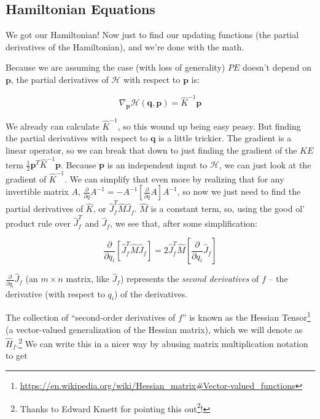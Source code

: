 \documentclass[]{article}
\renewcommand{\href}[2]{#2\footnote{\url{#1}}}
\begin{document}
\hypertarget{hamiltonian-equations}{%
\subsection{Hamiltonian Equations}\label{hamiltonian-equations}}

We got our Hamiltonian! Now just to find our updating functions (the partial
derivatives of the Hamiltonian), and we're done with the math.

Because we are assuming the case (with loss of generality) \(PE\) doesn't depend
on \(\mathbf{p}\), the partial derivatives of \(\mathcal{H}\) with respect to
\(\mathbf{p}\) is:

\[
\nabla_{\mathbf{p}} \mathcal{H}(\mathbf{q},\mathbf{p}) = \hat{K}^{-1} \mathbf{p}
\]

We already can calculate \(\hat{K}^{-1}\), so this wound up being easy peasy.
But finding the partial derivatives with respect to \(\mathbf{q}\) is a little
trickier. The gradient is a linear operator, so we can break that down to just
finding the gradient of the \(KE\) term
\(\frac{1}{2} \mathbf{p}^T \hat{K}^{-1} \mathbf{p}\). Because \(\mathbf{p}\) is
an independent input to \(\mathcal{H}\), we can just look at the gradient of
\(\hat{K}^{-1}\). We can simplify that even more by realizing that for any
invertible matrix \(A\),
\(\frac{\partial}{\partial q} A^{-1} = - A^{-1} \left[ \frac{\partial}{\partial q} A \right] A^{-1}\),
so now we just need to find the partial derivatives of \(\hat{K}\), or
\(\hat{J}_f^T \hat{M} \hat{J}_f\). \(\hat{M}\) is a constant term, so, using the
good ol' product rule over \(\hat{J}_f^T\) and \(\hat{J}_f\), we see that, after
some simplification:

\[
\frac{\partial}{\partial q_i} \left[ \hat{J}_f^T \hat{M} \hat{J}_f \right] =
    2 \hat{J}_f^T \hat{M} \left[ \frac{\partial}{\partial q_i} \hat{J}_f \right]
\]

\(\frac{\partial}{\partial q_i} \hat{J}_f\) (an \(m \times n\) matrix, like
\(\hat{J}_f\)) represents the \emph{second derivatives} of \(f\) -- the
derivative (with respect to \(q_i\)) of the derivatives.

The collection of ``second-order derivatives of \(f\)'' is known as the
\href{https://en.wikipedia.org/wiki/Hessian_matrix\#Vector-valued_functions}{Hessian
Tensor} (a vector-valued generalization of the Hessian matrix), which we will
denote as \(\hat{H}_f\).\footnote{Thanks to Edward Kmett for
  \href{http://disq.us/p/1o4oyqh}{pointing this out}!} We can write this in a
nicer way by abusing matrix multiplication notation to get
\end{document}
